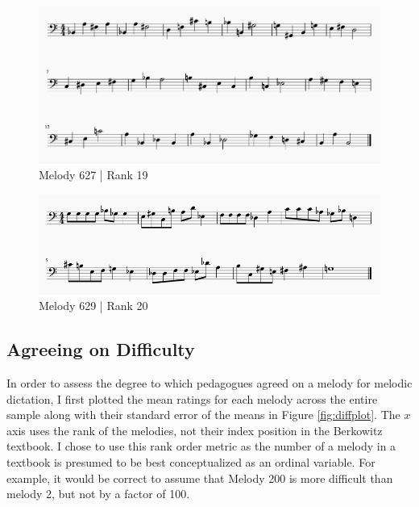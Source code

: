 \documentclass[12pt,]{book}
\begin{document}
\begin{figure}

{\centering \includegraphics[width=1\linewidth]{img/survey_melodies/Berkowitz627} 

}

\caption{Melody 627 | Rank 19}\label{fig:berk627}
\end{figure}

\begin{figure}

{\centering \includegraphics[width=1\linewidth]{img/survey_melodies/Berkowitz629} 

}

\caption{Melody 629 | Rank 20}\label{fig:berk629}
\end{figure}

\hypertarget{agreeing-on-difficulty}{%
\subsection{Agreeing on Difficulty}\label{agreeing-on-difficulty}}

In order to assess the degree to which pedagogues agreed on a melody for melodic dictation, I first plotted the mean ratings for each melody across the entire sample along with their standard error of the means in Figure \ref{fig:diffplot}.
The \(x\) axis uses the rank of the melodies, not their index position in the Berkowitz textbook.
I chose to use this rank order metric as the number of a melody in a textbook is presumed to be best conceptualized as an ordinal variable.
For example, it would be correct to assume that Melody 200 is more difficult than melody 2, but not by a factor of 100.
\end{document}
